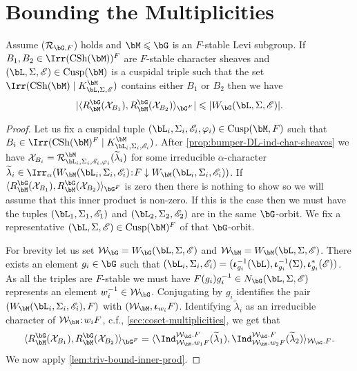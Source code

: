 \documentclass[eqthmnum,nocolour,skinny]{jt-calcs}
\DeclareMathOperator{\CS}{CSh}
\DeclareMathOperator{\Cusp}{Cusp}
\newcommand\sd{
	\mathchoice{\mkern1.5mu}{\mkern1.5mu}{}{}%
	{:}%
	\mathchoice{\mkern1.5mu}{\mkern1.5mu}{}{}
}
\begin{document}
\section{Bounding the Multiplicities}\label{sec:multiplicities}
\begin{lem}\label{prop:inner-prod-char-sheaves}
Assume ($\mathcal{R}_{\bG,F}$) holds and $\bM \leqslant \bG$ is an $F$-stable Levi subgroup. If $B_1,B_2 \in \Irr(\CS(\bM))^F$ are $F$-stable character sheaves and $(\bL,\Sigma,\mathscr{E}) \in \Cusp(\bM)$ is a cuspidal triple such that the set $\Irr(\CS(\bM) \mid K_{\bL,\Sigma,\mathscr{E}}^{\bM})$ contains either $B_1$ or $B_2$ then we have
\begin{equation*}
|\langle R_{\bM}^{\bG}(\mathcal{X}_{B_1}), R_{\bM}^{\bG}(\mathcal{X}_{B_2})\rangle_{\bG^F}| \leqslant |W_{\bG}(\bL,\Sigma,\mathscr{E})|.
\end{equation*}
\end{lem}

\begin{proof}
Let us fix a cuspidal tuple $(\bL_i,\Sigma_i,\mathscr{E}_i,\varphi_i) \in \Cusp(\bM,F)$ such that $B_i \in \Irr(\CS(\bM)^F \mid K_{\bL_i,\Sigma_i,\mathscr{E}_i}^{\bM})$. After \cref{prop:bumper-DL-ind-char-sheaves} we have $\mathcal{X}_{B_i} = \mathcal{R}_{\bL_i,\Sigma_i,\mathscr{E}_i,\varphi_i}^{\bM}(\widetilde{\lambda}_i)$ for some irreducible $\alpha$-character $\widetilde{\lambda}_i \in \Irr_{\alpha}(W_{\bM}(\bL_i,\Sigma_i,\mathscr{E}_i)\sd F \downarrow W_{\bM}(\bL_i,\Sigma_i,\mathscr{E}_i))$. If $\langle R_{\bM}^{\bG}(\mathcal{X}_{B_1}), R_{\bM}^{\bG}(\mathcal{X}_{B_2})\rangle_{\bG^F}$ is zero then there is nothing to show so we will assume that this inner product is non-zero. If this is the case then we must have the tuples $(\bL_1,\Sigma_1,\mathscr{E}_1)$ and $(\bL_2,\Sigma_2,\mathscr{E}_2)$ are in the same $\bG$-orbit. We fix a representative $(\bL,\Sigma,\mathscr{E}) \in \Cusp(\bM)^F$ of that $\bG$-orbit.

For brevity let us set $\mathcal{W}_{\bG} = W_{\bG}(\bL,\Sigma,\mathscr{E})$ and $\mathcal{W}_{\bM} = W_{\bM}(\bL,\Sigma,\mathscr{E})$. There exists an element $g_i \in \bG$ such that $(\bL_i,\Sigma_i,\mathscr{E}_i) = (\boldsymbol{\iota}_{g_i}^{-1}(\bL),\boldsymbol{\iota}_{g_i}^{-1}(\Sigma),\boldsymbol{\iota}_{g_i}^*(\mathscr{E}))$. As all the triples are $F$-stable we must have $F(g_i)g_i^{-1} \in N_{\bG}(\bL,\Sigma,\mathscr{E})$ represents an element $w_i^{-1} \in \mathcal{W}_{\bG}$. Conjugating by $g_i$ identifies the pair $(W_{\bM}(\bL_i,\Sigma_i,\mathscr{E}_i),F)$ with $(\mathcal{W}_{\bM},\boldsymbol{\iota}_{w_i}F)$. Identifying $\widetilde{\lambda}_i$ as an irreducible character of $\mathcal{W}_{\bM} \sd w_iF$, c.f., \cref{sec:coset-multiplicities}, we get that
\begin{equation*}
\langle R_{\bM}^{\bG}(\mathcal{X}_{B_1}), R_{\bM}^{\bG}(\mathcal{X}_{B_2})\rangle_{\bG^F} = \langle \Ind_{\mathcal{W}_{\bM}.w_1F}^{\mathcal{W}_{\bG}.F}(\widetilde{\lambda}_1),\Ind_{\mathcal{W}_{\bM}.w_2F}^{\mathcal{W}_{\bG}.F}(\widetilde{\lambda}_2)\rangle_{\mathcal{W}_{\bG}.F}.
\end{equation*}
We now apply \cref{lem:triv-bound-inner-prod}.
\end{proof}
\end{document}
